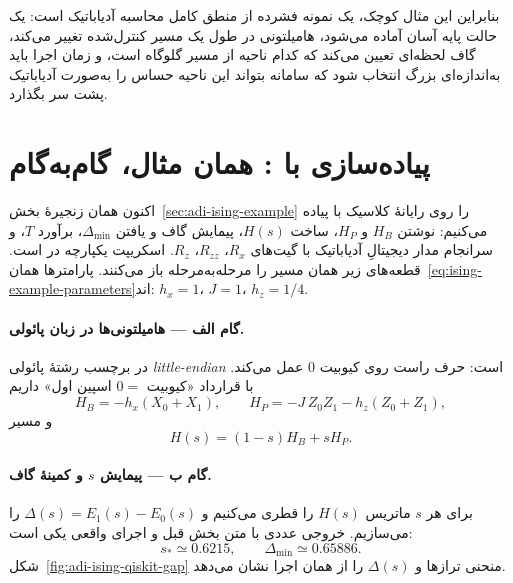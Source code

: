 بنابراین این مثال کوچک، یک نمونه فشرده از منطق کامل محاسبه آدیاباتیک است: یک حالت پایه آسان آماده می‌شود، هامیلتونی در طول یک مسیر کنترل‌شده تغییر می‌کند، گاف لحظه‌ای تعیین می‌کند که کدام ناحیه از مسیر گلوگاه است، و زمان اجرا باید به‌اندازه‌ای بزرگ انتخاب شود که سامانه بتواند این ناحیه حساس را به‌صورت آدیاباتیک پشت سر بگذارد.

\section{پیاده‌سازی با : همان مثال، گام‌به‌گام}
\label{sec:adi-ising-qiskit}

اکنون همان زنجیرهٔ بخش~\ref{sec:adi-ising-example} را روی رایانهٔ کلاسیک با
پیاده می‌کنیم: نوشتن $H_B$ و $H_P$، ساخت $H(s)$، پیمایش گاف و یافتن $\Delta_{\min}$، برآورد $T$، و سرانجام مدار دیجیتالِ آدیاباتیک با گیت‌های $R_x$، $R_{zz}$، $R_z$.
اسکریپت یکپارچه در
است.
قطعه‌های زیر همان مسیر را مرحله‌به‌مرحله باز می‌کنند. پارامترها همان~\eqref{eq:ising-example-parameters}اند:
$h_x=1$، $J=1$، $h_z=1/4$.

\paragraph{گام الف --- هامیلتونی‌ها در زبان پائولی.}
در  برچسب رشتهٔ پائولی \emph{little-endian} است: حرف راست روی کیوبیت $0$ عمل می‌کند. با قرارداد «کیوبیت $0=$ اسپین اول» داریم
\begin{equation}
	H_B=-h_x(X_0+X_1),
	\qquad
	H_P=-J\,Z_0Z_1-h_z(Z_0+Z_1),
\end{equation}
و مسیر
\begin{equation}
	H(s)=(1-s)H_B+sH_P.
\end{equation}


\paragraph{گام ب --- پیمایش $s$ و کمینهٔ گاف.}
برای هر $s$ ماتریس $H(s)$ را قطری می‌کنیم و
$\Delta(s)=E_1(s)-E_0(s)$
را می‌سازیم. خروجی عددی با متن بخش قبل و اجرای واقعی  یکی است:
\begin{equation}
	s_*\simeq0.6215,
	\qquad
	\Delta_{\min}\simeq0.65886.
\end{equation}
شکل~\ref{fig:adi-ising-qiskit-gap} منحنی ترازها و $\Delta(s)$ را از همان اجرا نشان می‌دهد.

